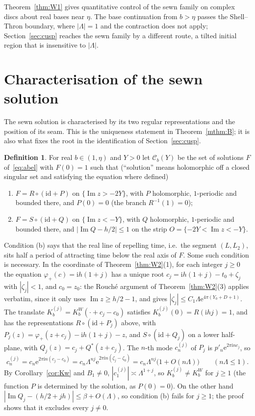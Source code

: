 \documentclass[11pt]{amsart}
\theoremstyle{definition}
\newtheorem{definition}[theorem]{Definition}
\newcommand{\Rr}{R}
\newcommand{\Kk}{K}
\newcommand{\eee}{\mathrm{e}}
\newcommand{\ii}{\mathrm{i}}
\begin{document}
Theorem~\ref{thm:W1} gives quantitative control of the sewn family on complex
discs about real bases near $\eta$.  The base continuation from $b>\eta$ passes the
Shell--Thron boundary, where $|\Lambda|=1$ and the contraction does not apply;
Section~\ref{sec:cusp} reaches the sewn family by a different route, a tilted
initial region that is insensitive to $|\Lambda|$.

\section{Characterisation of the sewn solution}\label{sec:char}

The sewn solution is characterised by its two regular representations and
the position of its seam.  This is the uniqueness statement in
Theorem~\ref{mthm:B}; it is also what fixes the root in the identification of
Section~\ref{sec:cusp}.

\begin{definition}\label{def:class}
For real $b\in(1,\eta)$ and $Y>0$ let $\mathcal C_b(Y)$ be the set of
solutions $F$ of~\eqref{eq:abel} with $F(0)=1$ such that
(``solution'' means holomorphic off a closed singular set and satisfying the
equation where defined)
\begin{enumerate}
\item[(a)] $F=\Rr\circ(\mathrm{id}+P)$ on $\{\operatorname{Im}z>-2Y\}$, with $P$
  holomorphic, $1$-periodic and bounded there, and $P(0)=0$ (the branch
  $\Rr^{-1}(1)=0$);
\item[(b)] $F=S\circ(\mathrm{id}+Q)$ on $\{\operatorname{Im}z<-Y\}$, with $Q$
  holomorphic, $1$-periodic and bounded there, and
  $|\operatorname{Im}Q-h/2|\le1$ on the strip $O=\{-2Y<\operatorname{Im}z<-Y\}$.
\end{enumerate}
\end{definition}

Condition (b) says that the real line of repelling time, i.e.\ the segment
$(L,L_2)$, sits half a period of attracting time below the real axis of $F$.
Some such condition is necessary.  In the coordinate of
Theorem~\ref{thm:W2}(1), for each integer $j\ge0$ the equation
$\varphi_+(c)=\ii h(1+j)$ has a unique root $c_j=\ii h(1+j)-t_0+\zeta_j$ with
$|\zeta_j|<1$, and $c_0=z_0$: the Rouch\'e argument of Theorem~\ref{thm:W2}(3)
applies verbatim, since it only uses $\operatorname{Im}z\ge h/2-1$, and gives
$|\zeta_j|\le C_1\Lambda\eee^{4\pi(Y_0+D+1)}$.  The translate
$\Kk^{(j)}_b=\Kk^W_b(\cdot+c_j-c_0)$ satisfies $\Kk^{(j)}_b(0)=\Rr(\ii hj)=1$, and has the
representations $\Rr\circ(\mathrm{id}+P_j)$ above, with
$P_j(z)=\varphi_+(z+c_j)-\ii h(1+j)-z$, and $S\circ(\mathrm{id}+Q_j)$ on a lower
half-plane, with $Q_j(z)=c_j+Q^*(z+c_j)$.  The $n$-th mode $c_n^{(j)}$ of
$P_j$ is $p'_n\eee^{2\pi\ii nc_j}$, so
\[
 c_n^{(j)}=c_n\eee^{2\pi\ii n(c_j-c_0)}
 =c_n\Lambda^{nj}\eee^{2\pi\ii n(\zeta_j-\zeta_0)}
 =c_n\Lambda^{nj}\bigl(1+O(n\Lambda)\bigr)\qquad(n\Lambda\le1).
\]
By Corollary~\ref{cor:Kw} and $B_1\ne0$, $|c_1^{(j)}|\asymp\Lambda^{1+j}$, so
$\Kk^{(j)}_b\ne\Kk^W_b$ for $j\ge1$ (the function $P$ is determined by the solution, as $P(0)=0$).  On the
other hand $|\operatorname{Im}Q_j-(h/2+jh)|\le\beta+O(\Lambda)$, so condition
(b) fails for $j\ge1$; the proof shows that it excludes every $j\ne0$.
\end{document}
